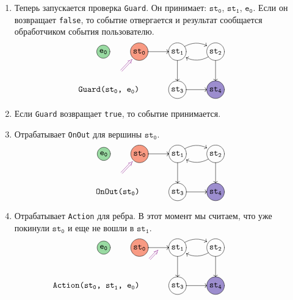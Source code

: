 \documentclass{article}
\begin{document}
{\begin{enumerate}
\item Теперь запускается проверка \verb"Guard".
Он принимает:  $\texttt{st}_\texttt{0}$,  $\texttt{st}_\texttt{1}$,  $\texttt{e}_\texttt{0}$.
Если он возвращает \verb"false", то событие отвергается и результат сообщается обработчиком события пользователю.
\[
\xymatrix{
  *+=+[o][F-][F*:EventColor]{\texttt{e}_\texttt{0}}&
  *+=+[o][F-][F*:InitialStateColor]{\texttt{st}_\texttt{0}}\ar[r]&
  *+=+[o][F-]{\texttt{st}_\texttt{1}}\ar@/^10pt/[r]\ar[d]&
  *+=+[o][F-]{\texttt{st}_\texttt{2}}\ar@/^10pt/[l]\ar[d]\\
  {}\ar@{}[ru]|(.50){}="A"|(0.8){}="B"\ar@[Plum]@{=>} "A";"B" 
  &
  {\mathmakebox[0pt][r]{\texttt{Guard(st}_\texttt{0}\texttt{, e}_\texttt{0}\texttt{)}}}&
  *+=+[o][F-]{\texttt{st}_\texttt{3}}\ar[r]&
  *+=+[o][F-][F*:FinalStateColor]{\texttt{st}_\texttt{4}}\\
}
\]

\item Если \verb"Guard" возвращает \verb"true", то событие принимается.

\item Отрабатывает \verb"OnOut" для вершины  $\texttt{st}_\texttt{0}$.
\[
\xymatrix{
  *+=+[o][F-][F*:EventColor]{\texttt{e}_\texttt{0}}&
  *+=+[o][F-][F*:InitialStateColor]{\texttt{st}_\texttt{0}}\ar[r]&
  *+=+[o][F-]{\texttt{st}_\texttt{1}}\ar@/^10pt/[r]\ar[d]&
  *+=+[o][F-]{\texttt{st}_\texttt{2}}\ar@/^10pt/[l]\ar[d]\\
  {}\ar@{}[ru]|(.50){}="A"|(0.8){}="B"\ar@[Plum]@{=>} "A";"B" 
  &
  {\mathmakebox[0pt][r]{\texttt{OnOut(st}_\texttt{0}\texttt{)}}}&
  *+=+[o][F-]{\texttt{st}_\texttt{3}}\ar[r]&
  *+=+[o][F-][F*:FinalStateColor]{\texttt{st}_\texttt{4}}\\
}
\]
\item Отрабатывает \verb"Action" для ребра.
В этот момент мы считаем, что уже покинули $\texttt{st}_\texttt{0}$ и еще не вошли в $\texttt{st}_\texttt{1}$.
\[
\xymatrix{
  *+=+[o][F-][F*:EventColor]{\texttt{e}_\texttt{0}}&
  *+=+[o][F-][F*:InitialStateColor]{\texttt{st}_\texttt{0}}\ar[r]\ar@{}[r]_(0.55){}="D"&
  *+=+[o][F-]{\texttt{st}_\texttt{1}}\ar@/^10pt/[r]\ar[d]&
  *+=+[o][F-]{\texttt{st}_\texttt{2}}\ar@/^10pt/[l]\ar[d]\\
  {}\ar@{}[ru]|(.50){}="A"|(0.8){}="B"
  \ar@[Plum]@{=>} "A" +"D" - "B"; "D"
  &
  {\mathmakebox[0pt][r]{\texttt{Action(st}_\texttt{0}\texttt{, st}_\texttt{1}\texttt{, e}_\texttt{0}\texttt{)}}}&
  *+=+[o][F-]{\texttt{st}_\texttt{3}}\ar[r]&
  *+=+[o][F-][F*:FinalStateColor]{\texttt{st}_\texttt{4}}\\
}
\]


\end{enumerate}}
\end{document}

